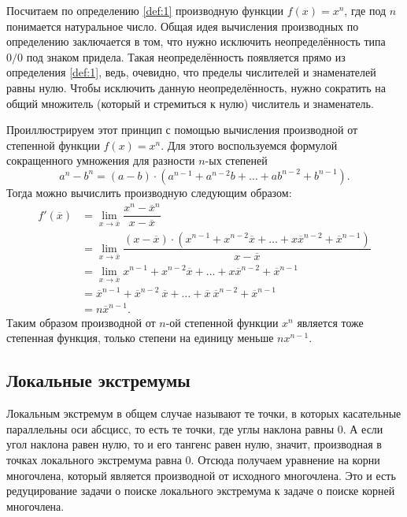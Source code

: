 \documentclass[12pt]{article}
\begin{document}
Посчитаем по определению \ref{def:1} производную функции $f(x) = x^n$, где под $n$ понимается натуральное число. Общая идея вычисления производных по определению заключается в том, что нужно исключить неопределённость типа $0/0$ под знаком придела. Такая неопределённость появляется прямо из определения \ref{def:1}, ведь, очевидно, что пределы числителей и знаменателей равны нулю. Чтобы исключить данную неопределённость, нужно сократить на общий множитель (который и стремиться к нулю) числитель и знаменатель.

\par Проиллюстрируем этот принцип с помощью вычисления производной от степенной функции $f(x) = x^n$. Для этого воспользуемся формулой сокращенного умножения \cite{sok_um} для разности $n$\--ых степеней
\begin{equation}
	a^n - b^n = (a-b)\cdot(a^{n-1} + a^{n-2}b + \ldots + ab^{n-2} + b^{n-1}).
\end{equation}
Тогда можно вычислить производную следующим образом:
\begin{equation}\label{eq:69}
\begin{split}
	f'(\overline{x}) &= \lim_{x\rightarrow\overline{x}}\dfrac{x^n - \overline{x}^n}{x - \overline{x}}\\
	&= \lim_{x\rightarrow\overline{x}} \dfrac{(x-\overline{x})\cdot(x^{n-1} + x^{n-2}\overline{x} + \ldots + x\overline{x}^{n-2} + \overline{x}^{n-1})}{x - \overline{x}}\\
	&= \lim_{x\rightarrow\overline{x}} x^{n-1} + x^{n-2}\overline{x} + \ldots + x\overline{x}^{n-2} + \overline{x}^{n-1}\\
	&= \overline{x}^{n-1} + \overline{x}^{n-2}\ \overline{x} + \ldots + \overline{x}\ \overline{x}^{n-2} + \overline{x}^{n-1}\\
	&= n \overline{x}^{n-1}.
\end{split}
\end{equation}
Таким образом производной от $n$\--ой степенной функции $x^n$ является тоже степенная функция, только степени на единицу меньше $nx^{n-1}$.

\subsection{Локальные экстремумы}
Локальным экстремум в общем случае называют те точки, в которых касательные параллельны оси абсцисс, то есть те точки, где углы наклона равны $0$. А если угол наклона равен нулю, то и его тангенс равен нулю, значит, производная в точках локального экстремума равна $0$. Отсюда получаем уравнение на корни многочлена, который является производной от исходного многочлена. Это и есть редуцирование задачи о поиске локального экстремума к задаче о поиске корней многочлена.
\end{document}
